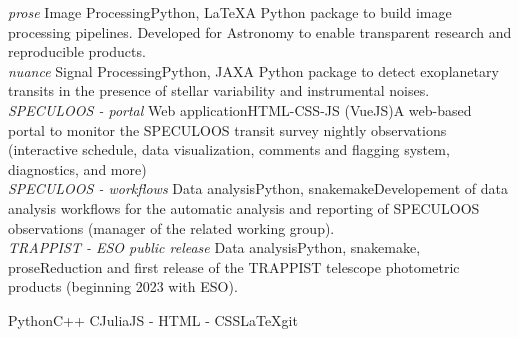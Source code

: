 \documentclass[8pt]{article}
\begin{document}
\begin{blocks}[1.3]
    \block{}
    {\textit{prose}\hspace{0.1cm}
    {\large\href{https://github.com/lgrcia/prose}{\color{black!30}\faGithub\hspace{2pt}}}
    {\large\href{https://ui.adsabs.harvard.edu/abs/2022MNRAS.509.4817G/abstract}{\color{black!30}\faFileTextO\hspace{2pt}}}}{Image Processing}{Python, LaTeX}{A Python package to build image processing pipelines. Developed for Astronomy to enable transparent research and reproducible products.}
    \\
    \block{}
    {\textit{nuance}\hspace{0.1cm}
    {\large\href{https://github.com/lgrcia/nuance}{\color{black!30}\faGithub\hspace{2pt}}}}
    {Signal Processing}{Python, JAX}{A Python package to detect exoplanetary transits in the presence of stellar variability and instrumental noises.}
    \\
    \block{}
    {\textit{SPECULOOS - portal}\hspace{0.1cm}
    {\large\href{https://lgrcia.github.io/projects/portal/}{\color{black!30}\faGlobe\hspace{2pt}}}}
    {Web application}{HTML-CSS-JS (VueJS)}{A web-based portal to monitor the SPECULOOS transit survey nightly observations (interactive schedule, data visualization, comments and flagging system, diagnostics, and more)}
    \\
    \block{}
    {\textit{SPECULOOS - workflows}\hspace{0.1cm}}
    {Data analysis}{Python, snakemake}{Developement of data analysis workflows for the automatic analysis and reporting of SPECULOOS observations (manager of the related working group).}
    \\
    \block{}
    {\textit{TRAPPIST - ESO public release}\hspace{0.1cm}}
    {Data analysis}{Python, snakemake, prose}{Reduction and first release of the TRAPPIST telescope photometric products (beginning 2023 with ESO).}
\end{blocks}

\begin{center}
    \color{black!70}
    \hspace{0.2cm} Python\space\space C++ \space\space C\space\space Julia\space\space JS - HTML - CSS\space\space LaTeX\space\space git

\end{center}
\vspace{0.4cm}
\end{document}
